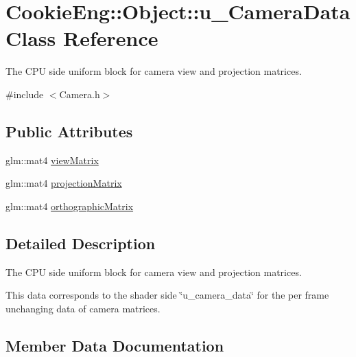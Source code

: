 \hypertarget{struct_cookie_eng_1_1_object_1_1u___camera_data}{}\section{Cookie\+Eng\+:\+:Object\+:\+:u\+\_\+\+Camera\+Data Class Reference}
\label{struct_cookie_eng_1_1_object_1_1u___camera_data}


The C\+PU side uniform block for camera view and projection matrices.  




{\ttfamily \#include $<$Camera.\+h$>$}

\subsection*{Public Attributes}
\begin{DoxyCompactItemize}
\item 
glm\+::mat4 \hyperlink{struct_cookie_eng_1_1_object_1_1u___camera_data_a1b1b0afdb4ac8c07474be855341516e4}{view\+Matrix}
\item 
glm\+::mat4 \hyperlink{struct_cookie_eng_1_1_object_1_1u___camera_data_ad96d4277fd1ef3111e1ee93353b771d7}{projection\+Matrix}
\item 
glm\+::mat4 \hyperlink{struct_cookie_eng_1_1_object_1_1u___camera_data_a2d4d4b2b54d89fac3ff12eac184167b1}{orthographic\+Matrix}
\end{DoxyCompactItemize}


\subsection{Detailed Description}
The C\+PU side uniform block for camera view and projection matrices. 

This data corresponds to the shader side \char`\"{}u\+\_\+camera\+\_\+data\char`\"{} for the per frame unchanging data of camera matrices. 

\subsection{Member Data Documentation}
\mbox{\label{struct_cookie_eng_1_1_object_1_1u___camera_data_a2d4d4b2b54d89fac3ff12eac184167b1}} 
